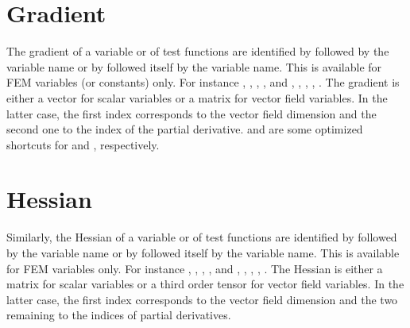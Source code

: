 \documentclass[a4paper,11pt,english]{sphinxmanual}
\begin{document}
\section{Gradient}
\label{\detokenize{userdoc/gasm_high:gradient}}
The gradient of a variable or of test functions are identified by  followed by the variable name or by  followed itself by the variable name. This is available for FEM variables (or constants) only. For instance , , , ,  and , , , , . The gradient is either a vector for scalar variables or a matrix for vector field variables. In the latter case, the first index corresponds to the vector field dimension and the second one to the index of the partial derivative.   and  are some optimized shortcuts for  and , respectively.


\section{Hessian}
\label{\detokenize{userdoc/gasm_high:hessian}}
Similarly, the Hessian of a variable or of test functions are identified by  followed by the variable name or by  followed itself by the variable name. This is available for FEM variables only. For instance , , , ,  and , , , , . The Hessian is either a matrix for scalar variables or a third order tensor for vector field variables. In the latter case, the first index corresponds to the vector field dimension and the two remaining to the indices of partial derivatives.
\end{document}
